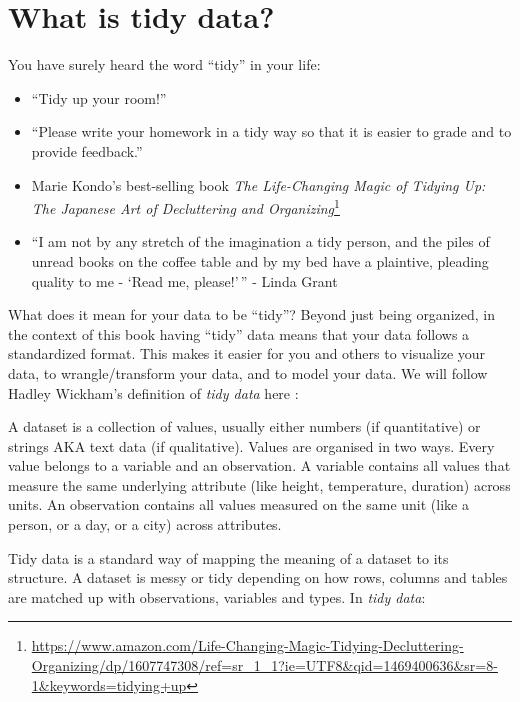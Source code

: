 \documentclass[12pt,]{krantz}
\providecommand{\tightlist}{%
  \setlength{\itemsep}{0pt}\setlength{\parskip}{0pt}}
\renewenvironment{quote}{\begin{VF}}{\end{VF}}
\renewcommand{\href}[2]{#2\footnote{\url{#1}}}
\theoremstyle{definition}
\theoremstyle{definition}
\theoremstyle{definition}
\theoremstyle{remark}
\begin{document}
\section{What is tidy data?}\label{what-is-tidy-data}

You have surely heard the word ``tidy'' in your life:

\begin{itemize}
\tightlist
\item
  ``Tidy up your room!''
\item
  ``Please write your homework in a tidy way so that it is easier to
  grade and to provide feedback.''
\item
  Marie Kondo's best-selling book
  \href{https://www.amazon.com/Life-Changing-Magic-Tidying-Decluttering-Organizing/dp/1607747308/ref=sr_1_1?ie=UTF8\&qid=1469400636\&sr=8-1\&keywords=tidying+up}{\emph{The
  Life-Changing Magic of Tidying Up: The Japanese Art of Decluttering
  and Organizing}}
\item
  ``I am not by any stretch of the imagination a tidy person, and the
  piles of unread books on the coffee table and by my bed have a
  plaintive, pleading quality to me - `Read me, please!'\,'' - Linda
  Grant
\end{itemize}

What does it mean for your data to be ``tidy''? Beyond just being
organized, in the context of this book having ``tidy'' data means that
your data follows a standardized format. This makes it easier for you
and others to visualize your data, to wrangle/transform your data, and
to model your data. We will follow Hadley Wickham's definition of
\emph{tidy data} here \citep{tidy}:

\begin{quote}
A dataset is a collection of values, usually either numbers (if
quantitative) or strings AKA text data (if qualitative). Values are
organised in two ways. Every value belongs to a variable and an
observation. A variable contains all values that measure the same
underlying attribute (like height, temperature, duration) across units.
An observation contains all values measured on the same unit (like a
person, or a day, or a city) across attributes.
\end{quote}

\begin{quote}
Tidy data is a standard way of mapping the meaning of a dataset to its
structure. A dataset is messy or tidy depending on how rows, columns and
tables are matched up with observations, variables and types. In
\emph{tidy data}:
\end{quote}
\end{document}
